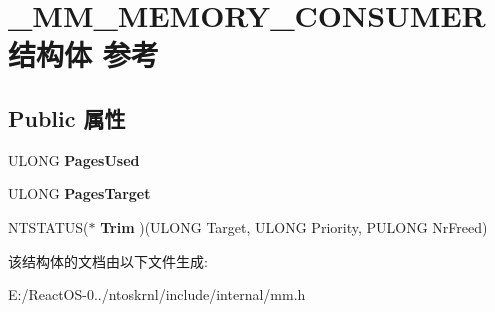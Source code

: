 \hypertarget{struct___m_m___m_e_m_o_r_y___c_o_n_s_u_m_e_r}{}\section{\+\_\+\+M\+M\+\_\+\+M\+E\+M\+O\+R\+Y\+\_\+\+C\+O\+N\+S\+U\+M\+E\+R结构体 参考}
\label{struct___m_m___m_e_m_o_r_y___c_o_n_s_u_m_e_r}
\subsection*{Public 属性}
\begin{DoxyCompactItemize}
\item 
\mbox{\label{struct___m_m___m_e_m_o_r_y___c_o_n_s_u_m_e_r_ac3234ac205f96854f660551732e50853}} 
U\+L\+O\+NG {\bfseries Pages\+Used}
\item 
\mbox{\label{struct___m_m___m_e_m_o_r_y___c_o_n_s_u_m_e_r_a9bfe61d30a84add5a24303e33157e1d2}} 
U\+L\+O\+NG {\bfseries Pages\+Target}
\item 
\mbox{\label{struct___m_m___m_e_m_o_r_y___c_o_n_s_u_m_e_r_a6aeac7e087e68dcacca2990a372eaa2d}} 
N\+T\+S\+T\+A\+T\+US($\ast$ {\bfseries Trim} )(U\+L\+O\+NG Target, U\+L\+O\+NG Priority, P\+U\+L\+O\+NG Nr\+Freed)
\end{DoxyCompactItemize}


该结构体的文档由以下文件生成\+:\begin{DoxyCompactItemize}
\item 
E\+:/\+React\+O\+S-\/0../ntoskrnl/include/internal/mm.\+h\end{DoxyCompactItemize}
